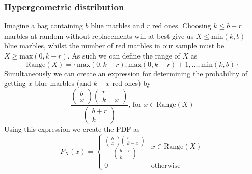 \subsubsection{Hypergeometric distribution}
Imagine a bag containing $b$ blue marbles and $r$ red ones. Choosing $k\leq b+r$ marbles at random without replacements will at best give us $X\leq \text{min}(k,b)$ blue marbles, whilst the number of red marbles in our sample must be $X\geq \text{max}(0,k-r)$. As such we can define the range of $X$ as
\[
    \text{Range}(X)=\{\text{max}(0,k-r),\text{max}(0,k-r)+1,\ldots,\text{min}(k,b)\}
\]
Simultaneously we can create an expression for determining the probability of getting $x$ blue marbles (and $k-x$ red ones) by
\[
    \frac{\begin{pmatrix}b\\x\end{pmatrix}\begin{pmatrix}r\\k-x\end{pmatrix}}{\begin{pmatrix}b+r\\k\end{pmatrix}} \text{, for } x\in \text{Range}(X)
\]
Using this expression we create the PDF as
\[
    P_{X}(x)=\begin{cases}\frac{\begin{pmatrix}b\\x\end{pmatrix}\begin{pmatrix}r\\k-x\end{pmatrix}}{\begin{pmatrix}b+r\\k\end{pmatrix}} & x\in \text{Range}(X) \\ 0 & \text{otherwise}\end{cases}
\]
